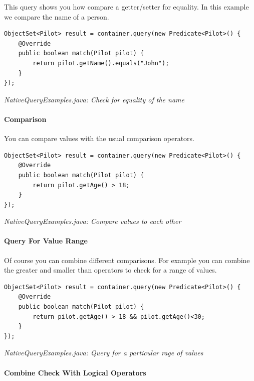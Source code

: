 This query shows you how compare a getter/setter for equality. In this example we compare the name of a person.

\begin{lstlisting}
ObjectSet<Pilot> result = container.query(new Predicate<Pilot>() {
    @Override
    public boolean match(Pilot pilot) {
        return pilot.getName().equals("John");
    }
});
\end{lstlisting}

{\small\itshape NativeQueryExamples.java: Check for equality of the name\par}
\medskip

\paragraph{Comparison}
\label{ref:basics-querying-native-queries-native-query-examples:comparison}

You can compare values with the usual comparison operators.

\begin{lstlisting}
ObjectSet<Pilot> result = container.query(new Predicate<Pilot>() {
    @Override
    public boolean match(Pilot pilot) {
        return pilot.getAge() > 18;
    }
});
\end{lstlisting}

{\small\itshape NativeQueryExamples.java: Compare values to each other\par}
\medskip

\paragraph{Query For Value Range}
\label{ref:basics-querying-native-queries-native-query-examples:valuerange}

Of course you can combine different comparisons. For example you can combine the greater and smaller than operators to check for a range of values.

\begin{lstlisting}
ObjectSet<Pilot> result = container.query(new Predicate<Pilot>() {
    @Override
    public boolean match(Pilot pilot) {
        return pilot.getAge() > 18 && pilot.getAge()<30;
    }
});
\end{lstlisting}

{\small\itshape NativeQueryExamples.java: Query for a particular rage of values\par}
\medskip

\paragraph{Combine Check With Logical Operators}
\label{ref:basics-querying-native-queries-native-query-examples:logicaloperators}

